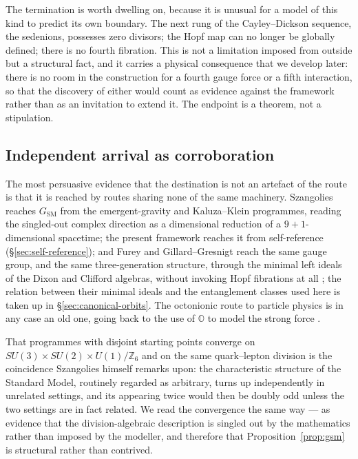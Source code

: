 The termination is worth dwelling on, because it is unusual for a model of this kind to predict its own boundary. The next rung of the Cayley--Dickson sequence, the sedenions, possesses zero divisors; the Hopf map can no longer be globally defined; there is no fourth fibration. This is not a limitation imposed from outside but a structural fact, and it carries a physical consequence that we develop later: there is no room in the construction for a fourth gauge force or a fifth interaction, so that the discovery of either would count as evidence against the framework rather than as an invitation to extend it. The endpoint is a theorem, not a stipulation.

\subsection{Independent arrival as corroboration}

The most persuasive evidence that the destination is not an artefact of the route is that it is reached by routes sharing none of the same machinery. Szangolies \autocite{szangolies2025standardmodel} reaches $G_{\mathrm{SM}}$ from the emergent-gravity and Kaluza--Klein programmes, reading the singled-out complex direction as a dimensional reduction of a $9+1$-dimensional spacetime; the present framework reaches it from self-reference (\S\ref{sec:self-reference}); and Furey and Gillard--Gresnigt reach the same gauge group, and the same three-generation structure, through the minimal left ideals of the Dixon and Clifford algebras, without invoking Hopf fibrations at all \autocite{furey2018three,gillardgresnigt2019three}; the relation between their minimal ideals and the entanglement classes used here is taken up in \S\ref{sec:canonical-orbits}. The octonionic route to particle physics is in any case an old one, going back to the use of $\mathbb{O}$ to model the strong force \autocite{gunaydingursey1974quark}.

That programmes with disjoint starting points converge on $SU(3) \times SU(2) \times U(1)/\mathbb{Z}_6$ and on the same quark--lepton division is the coincidence Szangolies himself remarks upon: the characteristic structure of the Standard Model, routinely regarded as arbitrary, turns up independently in unrelated settings, and its appearing twice would then be doubly odd unless the two settings are in fact related. We read the convergence the same way --- as evidence that the division-algebraic description is singled out by the mathematics rather than imposed by the modeller, and therefore that Proposition~\ref{prop:gsm} is structural rather than contrived.

